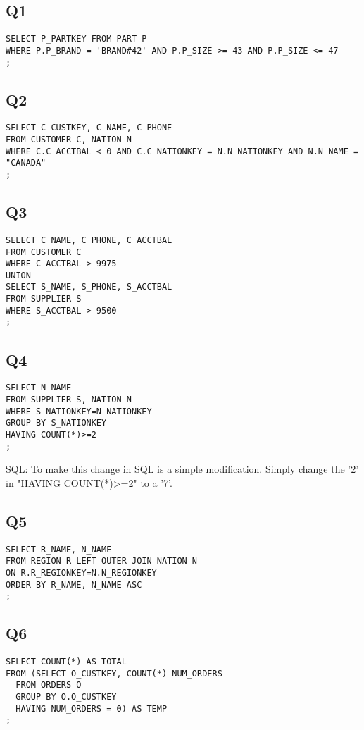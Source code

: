 \documentclass[12pt]{article}
\begin{document}
\subsection*{Q1}
\begin{verbatim}
SELECT P_PARTKEY FROM PART P
WHERE P.P_BRAND = 'BRAND#42' AND P.P_SIZE >= 43 AND P.P_SIZE <= 47
;
\end{verbatim}

\subsection*{Q2}
\begin{verbatim}
SELECT C_CUSTKEY, C_NAME, C_PHONE
FROM CUSTOMER C, NATION N
WHERE C.C_ACCTBAL < 0 AND C.C_NATIONKEY = N.N_NATIONKEY AND N.N_NAME = "CANADA"
;
\end{verbatim}

\subsection*{Q3}
\begin{verbatim}
SELECT C_NAME, C_PHONE, C_ACCTBAL
FROM CUSTOMER C
WHERE C_ACCTBAL > 9975
UNION
SELECT S_NAME, S_PHONE, S_ACCTBAL
FROM SUPPLIER S
WHERE S_ACCTBAL > 9500
;
\end{verbatim}

\subsection*{Q4}
\begin{verbatim}
SELECT N_NAME
FROM SUPPLIER S, NATION N
WHERE S_NATIONKEY=N_NATIONKEY
GROUP BY S_NATIONKEY
HAVING COUNT(*)>=2
;
\end{verbatim}
SQL: To make this change in SQL is a simple modification. Simply change the '2' in "HAVING COUNT(*)>=2" to a '7'.

\subsection*{Q5}
\begin{verbatim}
SELECT R_NAME, N_NAME
FROM REGION R LEFT OUTER JOIN NATION N
ON R.R_REGIONKEY=N.N_REGIONKEY
ORDER BY R_NAME, N_NAME ASC
;
\end{verbatim}

\subsection*{Q6}
\begin{verbatim}
SELECT COUNT(*) AS TOTAL
FROM (SELECT O_CUSTKEY, COUNT(*) NUM_ORDERS
  FROM ORDERS O
  GROUP BY O.O_CUSTKEY
  HAVING NUM_ORDERS = 0) AS TEMP
;
\end{verbatim}
\end{document}
